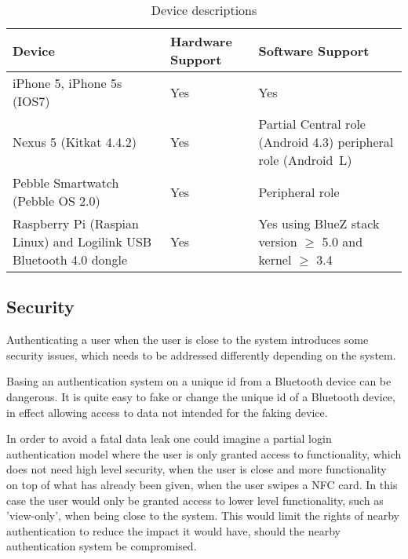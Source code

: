 \begin{table}[!t]
\caption{Device descriptions}
\label{table:devices}
\centering
\begin{tabular}{|p{3cm}|p{3.5cm}|p{4cm}|}
\hline
\textbf{Device} & \textbf{Hardware Support} & \textbf{Software Support}\\
\hline
iPhone 5, iPhone 5s (IOS7) & Yes & Yes\\
\hline
Nexus 5 \newline (Kitkat 4.4.2) & Yes & Partial \newline
Central role (Android 4.3)  \newline
peripheral role (Android~L)\\
\hline
Pebble Smartwatch (Pebble OS 2.0) & Yes & Peripheral role\\
\hline
Raspberry Pi (Raspian Linux) and Logilink USB Bluetooth 4.0 dongle & Yes & Yes using BlueZ stack version $\geq$ 5.0 and kernel $\geq$ 3.4\\
\hline

\end{tabular}
\end{table}


\subsection{Security}

Authenticating a user when the user is close to the system introduces some security issues, which needs to be addressed differently depending on the system.

Basing an authentication system on a unique id from a Bluetooth device can be dangerous. It is quite easy to fake or change the unique id of a Bluetooth device, in effect allowing access to data not intended for the faking device.

In order to avoid a fatal data leak one could imagine a partial login authentication model\cite{ref:covington} where the user is only granted access to functionality, which does not need high level security, when the user is close and more functionality on top of what has already been given, when the user swipes a NFC card.
In this case the user would only be granted access to lower level functionality, such as 'view-only', when being close to the system. This would limit the rights of nearby authentication to reduce the impact it would have, should the nearby authentication system be compromised.


